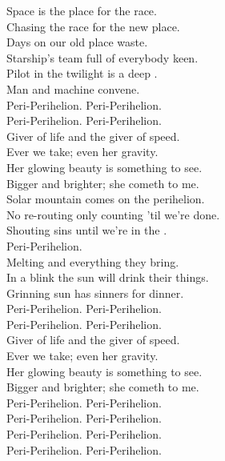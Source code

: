 Space is the place for the  race. \\
Chasing the race for the new place. \\
Days on our old place waste. \\
Starship's team full of everybody keen. \\
Pilot in the twilight is a deep . \\
Man and machine convene. \\

Peri-Perihelion. Peri-Perihelion. \\
Peri-Perihelion. Peri-Perihelion. \\

Giver of life and the giver of speed. \\
Ever we take; even her gravity. \\
Her glowing beauty is something to see. \\
Bigger and brighter; she cometh to me. \\

Solar mountain comes on the perihelion. \\
No re-routing only counting 'til we're done. \\
Shouting sins until we're in the . \\
Peri-Perihelion. \\
Melting  and everything they bring. \\
In a blink the sun will drink their things. \\
Grinning sun has sinners for dinner. \\

Peri-Perihelion. Peri-Perihelion. \\
Peri-Perihelion. Peri-Perihelion. \\

Giver of life and the giver of speed. \\
Ever we take; even her gravity. \\
Her glowing beauty is something to see. \\
Bigger and brighter; she cometh to me. \\

Peri-Perihelion. Peri-Perihelion. \\
Peri-Perihelion. Peri-Perihelion. \\
Peri-Perihelion. Peri-Perihelion. \\
Peri-Perihelion. Peri-Perihelion. \\


